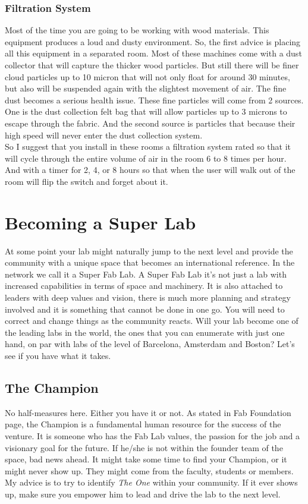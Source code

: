 \documentclass[a4paper,12pt,titlepage]{article}
\begin{document}
\subsubsection*{Filtration System}
Most of the time you are going to be working with wood materials. This equipment
produces a loud and dusty environment. So, the first advice is
placing all this equipment in a separated room. Most of these machines come with
a dust collector that will capture the thicker wood particles. But still there will be finer cloud
particles up to 10 micron that will not only float for around 30 minutes, but also will be
suspended again with the slightest movement of air. The fine dust becomes a serious health issue. These
fine particles will come from 2 sources. One is the dust collection felt bag that will allow
particles up to 3 microns to escape through the fabric. And the second source is particles that because their high speed will never enter the dust collection system.\\

So I suggest that you install in these rooms a filtration system rated so that it will cycle through
the entire volume of air in the room 6 to 8 times per hour. And with a timer for 2, 4, or 8 hours
so that when the user will walk out of the room will flip the switch and forget about it.

\section{Becoming a Super Lab}
At some point your lab might naturally jump to the next level and provide the community with a unique space
that becomes an international reference. In the network we call it a Super Fab Lab. A
Super Fab Lab it's not just a lab with increased capabilities in terms of space and
machinery. It is also attached to leaders with  deep values and vision, there is much more planning and strategy involved and it is something that
cannot be done in one go. You will need to correct and change things as the
community reacts. Will your lab become one of the
leading labs in the world, the ones that you can enumerate with just one hand, on par
with labs of the level of Barcelona, Amsterdam and Boston? Let's see if you have what it takes.
\subsection{The Champion}
No half-measures here. Either you have it or not. As stated in Fab Foundation page, the Champion is a fundamental human resource for the success of the
venture. It is someone who has the Fab Lab values, the passion for the job and a visionary goal for
the future. If he/she is not within the founder team of the space, bad news ahead. It might take some time to find your Champion, or it might never show up. They might
come from the faculty, students or members. My advice is to try to identify \textit{The One} within your community. If it
ever shows up, make sure you empower him to lead and drive the lab to the next level.
\end{document}
